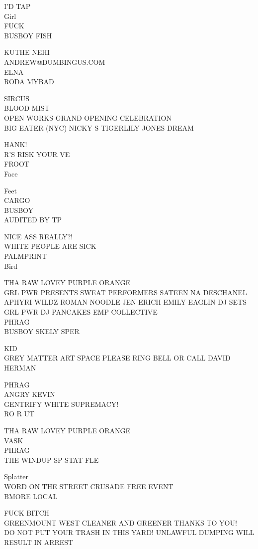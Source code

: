 \documentclass[10pt,letterpaper]{article}
\begin{document}
I'D TAP\\
Girl\\
FUCK\\
BUSBOY FISH

KUTHE NEHI\\
ANDREW@DUMBINGUS.COM\\
ELNA\\
RODA MYBAD

SIRCUS\\
BLOOD MIST\\
OPEN WORKS GRAND OPENING CELEBRATION\\
BIG EATER (NYC) NICKY S TIGERLILY JONES DREAM

HANK!\\
R'S RISK YOUR VE\\
FROOT\\
Face

Feet\\
CARGO\\
BUSBOY\\
AUDITED BY TP

NICE ASS REALLY?!\\
WHITE PEOPLE ARE SICK\\
PALMPRINT\\
Bird

THA RAW LOVEY PURPLE ORANGE\\
GRL PWR PRESENTS SWEAT PERFORMERS SATEEN  NA DESCHANEL APHYRI WILDZ ROMAN NOODLE JEN ERICH EMILY EAGLIN DJ SETS GRL PWR DJ PANCAKES EMP COLLECTIVE\\
PHRAG\\
BUSBOY SKELY SPER

KID\\
GREY MATTER ART SPACE PLEASE RING BELL OR CALL DAVID HERMAN

PHRAG\\
ANGRY KEVIN\\
GENTRIFY WHITE SUPREMACY!\\
RO R UT

THA RAW LOVEY PURPLE ORANGE\\
VASK\\
PHRAG\\
THE WINDUP SP STAT FLE

Splatter\\
WORD ON THE STREET CRUSADE FREE EVENT\\
BMORE LOCAL

FUCK BITCH\\
GREENMOUNT WEST CLEANER AND GREENER THANKS TO YOU!\\
DO NOT PUT YOUR TRASH IN THIS YARD!  UNLAWFUL DUMPING WILL RESULT IN ARREST
\end{document}
